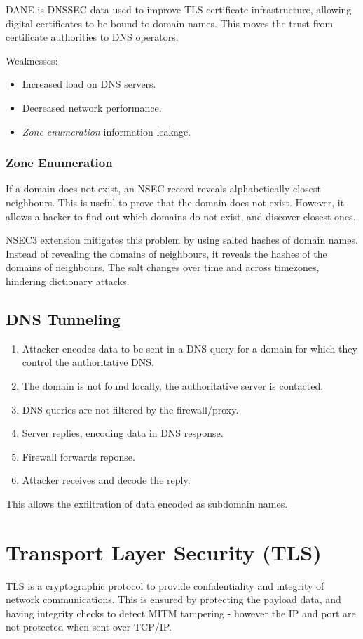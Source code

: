 \documentclass[11pt]{article}
\begin{document}
DANE is DNSSEC data used to improve TLS certificate infrastructure, allowing digital certificates to be bound to domain names.
This moves the trust from certificate authorities to DNS operators.

Weaknesses:
\begin{itemize}
  \item Increased load on DNS servers.
  \item Decreased network performance.
  \item \textit{Zone enumeration} information leakage.
\end{itemize}

\subsubsection{Zone Enumeration}
If a domain does not exist, an NSEC record reveals alphabetically-closest neighbours.
This is useful to prove that the domain does not exist.
However, it allows a hacker to find out which domains do not exist, and discover closest ones.

NSEC3 extension mitigates this problem by using salted hashes of domain names.
Instead of revealing the domains of neighbours, it reveals the hashes of the domains of neighbours.
The salt changes over time and across timezones, hindering dictionary attacks.

\subsection{DNS Tunneling}
\begin{enumerate}
  \item Attacker encodes data to be sent in a DNS query for a domain for which they control the authoritative DNS.
  \item The domain is not found locally, the authoritative server is contacted.
  \item DNS queries are not filtered by the firewall/proxy.
  \item Server replies, encoding data in DNS response.
  \item Firewall forwards reponse.
  \item Attacker receives and decode the reply.
\end{enumerate}

This allows the exfiltration of data encoded as subdomain names.

\section{Transport Layer Security (TLS)}
TLS is a cryptographic protocol to provide confidentiality and integrity of network communications.
This is ensured by protecting the payload data, and having integrity checks to detect MITM tampering - however the IP and port are not protected when sent over TCP/IP.
\end{document}
